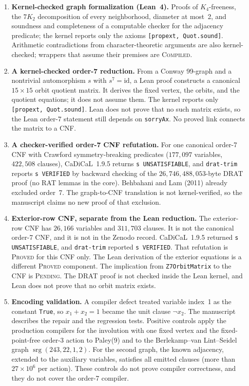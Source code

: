 \documentclass[10pt,a4paper]{article}
\begin{document}
\begin{enumerate}[leftmargin=1.5em, itemsep=0.75pt, topsep=0.75pt]
  \item \textbf{Kernel-checked graph formalization (Lean~4).} Proofs of $K_4$-freeness, the $7K_2$ decomposition of every neighborhood, diameter at most~2, and soundness and completeness of a computable checker for the adjacency predicate; the kernel reports only the axioms \texttt{[propext, Quot.sound]}. Arithmetic contradictions from character-theoretic arguments are also kernel-checked; wrappers that assume their premises are \textsc{Compiled}.
  \item \textbf{A kernel-checked order-7 reduction.} From a Conway 99-graph and a nontrivial automorphism $s$ with $s^7 = \mathrm{id}$, a Lean proof constructs a canonical $15 \times 15$ orbit quotient matrix. It derives the fixed vertex, the orbits, and the quotient equations; it does not assume them. The kernel reports only \texttt{[propext, Quot.sound]}. Lean does not prove that no such matrix exists, so the Lean order-7 statement still depends on \texttt{sorryAx}. No proved link connects the matrix to a CNF.
  \item \textbf{A checker-verified order-7 CNF refutation.} For one canonical order-7 CNF with Crawford symmetry-breaking predicates ($177{,}097$ variables, $422{,}508$ clauses), CaDiCaL~1.9.5 returns \texttt{s UNSATISFIABLE}, and \texttt{drat-trim} reports \texttt{s VERIFIED} by backward checking of the $26{,}746{,}488{,}053$-byte DRAT proof (no RAT lemmas in the core). Behbahani and Lam (2011) already excluded order~7. The graph-to-CNF translation is not kernel-verified, so the manuscript claims no new proof of that exclusion.
  \item \textbf{Exterior-row CNF, separate from the Lean reduction.} The exterior-row CNF has $26{,}166$ variables and $311{,}703$ clauses. It is not the canonical order-7 CNF, and it is not in the Zenodo record. CaDiCaL~1.9.5 returned \texttt{s UNSATISFIABLE}, and \texttt{drat-trim} reported \texttt{s VERIFIED}. That refutation is \textsc{Proved} for this CNF only. The Lean derivation of the exterior equations is a different \textsc{Proved} component. The implication from \texttt{Z7OrbitMatrix} to the CNF is \textsc{Pending}. The DRAT proof is not checked inside the Lean kernel, and Lean does not prove that no orbit matrix exists.
  \item \textbf{Encoding validation.} A compiler defect treated variable index~1 as the constant \texttt{True}, so $x_1 + x_2 = 1$ became the unit clause $\neg x_2$. The manuscript describes the repair and the regression tests. Positive controls apply the production compilers for the involution with one fixed vertex and the fixed-point-free order-3 action to Paley(9) and to the Berlekamp--van Lint--Seidel graph $\operatorname{srg}(243,22,1,2)$. For the second graph, the known adjacency, extended to the auxiliary variables, satisfies all emitted clauses (more than $27 \times 10^6$ per action). These controls do not prove compiler correctness, and they do not cover the order-7 compiler.

\end{enumerate}
\end{document}
